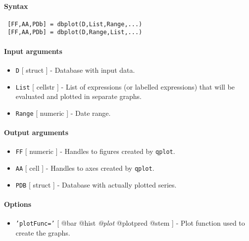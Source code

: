 


	\paragraph{Syntax}
 
 \begin{verbatim}
 [FF,AA,PDb] = dbplot(D,List,Range,...)
 [FF,AA,PDb] = dbplot(D,Range,List,...)
 \end{verbatim}
 
 \paragraph{Input arguments}
 
 \begin{itemize}
 \item
   \texttt{D} {[} struct {]} - Database with input data.
 \item
   \texttt{List} {[} cellstr {]} - List of expressions (or labelled
   expressions) that will be evaluated and plotted in separate graphs.
 \item
   \texttt{Range} {[} numeric {]} - Date range.
 \end{itemize}
 
 \paragraph{Output arguments}
 
 \begin{itemize}
 \item
   \texttt{FF} {[} numeric {]} - Handles to figures created by
   \texttt{qplot}.
 \item
   \texttt{AA} {[} cell {]} - Handles to axes created by \texttt{qplot}.
 \item
   \texttt{PDB} {[} struct {]} - Database with actually plotted series.
 \end{itemize}
 
 \paragraph{Options}
 
 \begin{itemize}
 \item
   \texttt{'plotFunc='} {[} @bar \textbar{} @hist \textbar{} \emph{@plot}
   \textbar{} @plotpred \textbar{} @stem {]} - Plot function used to
   create the graphs.
 \end{itemize}
 
